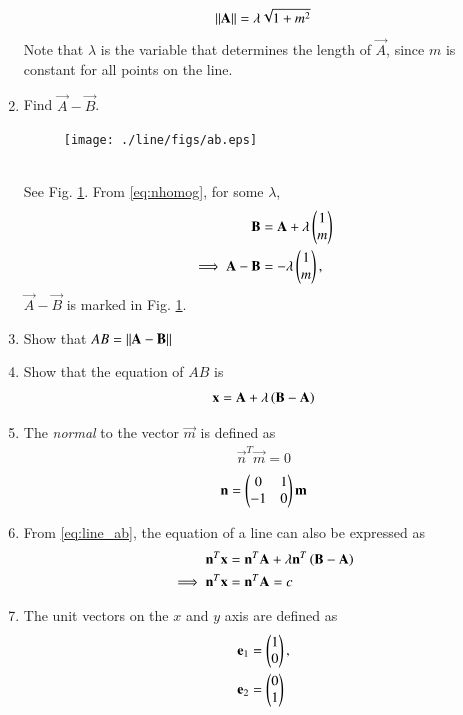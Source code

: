 \begin{enumerate}[label=\arabic*.,ref=\thesubsection.\theenumi]
\begin{equation}
\left\lVert\mathbf{A}\right\rVert = \lambda \sqrt{1+m^2}
\end{equation}
%
Note that $\lambda$ is the variable that determines the length of $\vec{A}$, 
since $m$ is constant for all points on the line.
%
\item Find $\vec{A}-\vec{B}$.
\begin{figure}
\centering
\texttt{[image: ./line/figs/ab.eps]}
\caption{}
\label{fig:ab}
\end{figure}
%
\\
\solution See Fig. \ref{fig:ab}. From \eqref{eq:nhomog}, for some 
$\lambda$,
\begin{align}
\mathbf{B} &=\mathbf{A} + \lambda \begin{pmatrix}1 \\ m\end{pmatrix}
\\
\implies \mathbf{A} - \mathbf{B} &= - \lambda \begin{pmatrix}1 \\ m\end{pmatrix},
\end{align}
%
$\vec{A} - \vec{B}$ is marked in Fig. \ref{fig:ab}.
%
\item Show that $AB = \left\lVert\mathbf{A}-\mathbf{B}\right\rVert$
\item Show that the equation of $AB$ is
\begin{align}
\label{eq:line_ab}
\mathbf{x} = \mathbf{A}+ \lambda\left(\mathbf{B}-\mathbf{A}\right)
\end{align}
%
\item The {\em normal} to the vector $\vec{m}$ is defined as
\begin{align}
\label{eq:normal}
\vec{n}^T\vec{m} = 0
\end{align}
\begin{align}
\label{eq:normal_omat}
\mathbf{n} = \begin{pmatrix}0 & 1\\ -1 & 0\end{pmatrix}\mathbf{m}
\end{align}
\item From \eqref{eq:line_ab}, the equation of a line can also be expressed as
\begin{align}
\label{eq:line_ab_normal}
\mathbf{n}^T\mathbf{x} &= \mathbf{n}^T\mathbf{A}+ \lambda\mathbf{n}^T\left(\mathbf{B}-\mathbf{A}\right)
\\
\implies \mathbf{n}^T\mathbf{x} &=\mathbf{n}^T\mathbf{A}=c
\label{eq:line_normal}
\end{align}
\item The unit vectors on the $x$ and $y$ axis are defined as
\begin{align}
\label{eq:line_unit}
\mathbf{e}_1 &=\begin{pmatrix}1\\0\end{pmatrix}, 
\\
\mathbf{e}_2 &=\begin{pmatrix}0\\1\end{pmatrix}
\end{align}

\end{enumerate}
